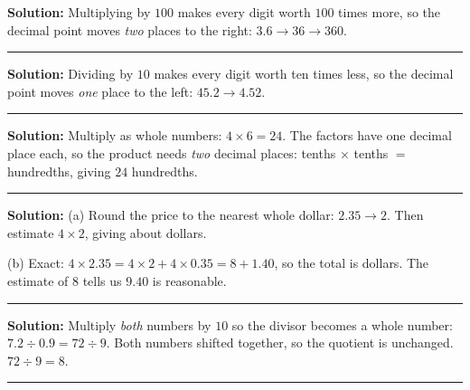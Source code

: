 \documentclass[12pt]{article}
\begin{document}



\textbf{Solution:} Multiplying by $100$ makes every digit worth $100$ times
more, so the decimal point moves \emph{two} places to the right:
$3.6 \to 36 \to 360$. 

\vspace{0.2cm}\noindent\rule{\linewidth}{0.2pt}\vspace{0.1cm}


\textbf{Solution:} Dividing by $10$ makes every digit worth ten times less, so
the decimal point moves \emph{one} place to the left: $45.2 \to 4.52$.

\vspace{0.2cm}\noindent\rule{\linewidth}{0.2pt}\vspace{0.1cm}


\textbf{Solution:} Multiply as whole numbers: $4 \times 6 = 24$. The factors
have one decimal place each, so the product needs \emph{two} decimal places:
tenths $\times$ tenths $=$ hundredths, giving $24$ hundredths. 

\vspace{0.2cm}\noindent\rule{\linewidth}{0.2pt}\vspace{0.1cm}


\textbf{Solution:}
(a) Round the price to the nearest whole dollar: $2.35 \to 2$. Then estimate
$4 \times 2$, giving about  dollars.

(b) Exact: $4 \times 2.35 = 4 \times 2 + 4 \times 0.35 = 8 + 1.40$, so the
total is  dollars. The estimate of $8$ tells us $9.40$ is
reasonable.

\vspace{0.2cm}\noindent\rule{\linewidth}{0.2pt}\vspace{0.1cm}


\textbf{Solution:} Multiply \emph{both} numbers by $10$ so the divisor becomes
a whole number: $7.2 \div 0.9 = 72 \div 9$. Both numbers shifted together, so
the quotient is unchanged. $72 \div 9 = 8$. 

\vspace{0.2cm}\noindent\rule{\linewidth}{0.2pt}\vspace{0.1cm}
\end{document}
